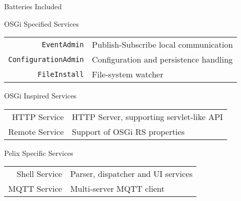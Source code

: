 \begin{frame}{Batteries Included}
\begin{block}{OSGi Specified Services}
\begin{tabular}{rl}
\texttt{EventAdmin} & Publish-Subscribe local communication \\
\texttt{ConfigurationAdmin} & Configuration and persistence handling \\
\texttt{FileInstall} & File-system watcher \\
\end{tabular}
\end{block}

\begin{block}{OSGi Inspired Services}
\begin{tabular}{rl}
HTTP Service & HTTP Server, supporting servlet-like API \\
Remote Service & Support of OSGi RS properties \\
\end{tabular}
\end{block}

\begin{block}{Pelix Specific Services}
\begin{tabular}{rl}
Shell Service & Parser, dispatcher and UI services \\
MQTT Service & Multi-server MQTT client \\
\end{tabular}
\end{block}
\end{frame}
